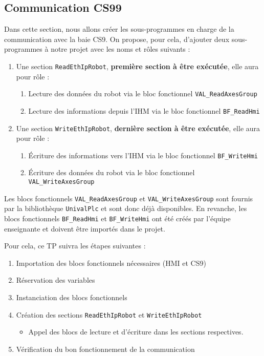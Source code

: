 
\subsection{Communication CS99}
Dans cette section, nous allons créer les sous-programmes en charge de la communication avec la baie CS9. 
On propose, pour cela, d'ajouter deux sous-programmes à notre projet avec les noms et rôles suivants : 
\begin{enumerate}
    \item Une section \texttt{ReadEthIpRobot}, \textbf{première section à être exécutée}, elle aura pour rôle :
    \begin{enumerate}
        \item Lecture des données du robot via le bloc fonctionnel \texttt{VAL\_ReadAxesGroup}
        \item Lecture des informations depuis l'IHM via le bloc fonctionnel \texttt{BF\_ReadHmi}
    \end{enumerate} 
    \item Une section \texttt{WriteEthIpRobot}, \textbf{dernière section à être exécutée}, elle aura pour rôle :
    \begin{enumerate}[resume]
        \item Écriture des informations vers l'IHM via le bloc fonctionnel \texttt{BF\_WriteHmi}
        \item Écriture des données du robot via le bloc fonctionnel \texttt{VAL\_WriteAxesGroup}
    \end{enumerate}
\end{enumerate}

Les blocs fonctionnels \texttt{VAL\_ReadAxesGroup} et \texttt{VAL\_WriteAxesGroup} sont fournis par la bibliothèque \texttt{UnivalPlc} et sont donc déjà disponibles. 
En revanche, les blocs fonctionnels \texttt{BF\_ReadHmi} et \texttt{BF\_WriteHmi} ont été créés par l'équipe enseignante et doivent être importés dans le projet. 

Pour cela, ce TP suivra les étapes suivantes : 
\begin{enumerate}
    \item Importation des blocs fonctionnels nécessaires (HMI et CS9)
    \item Réservation des variables 
    \item Instanciation des blocs fonctionnels
    \item Création des sections \texttt{ReadEthIpRobot} et \texttt{WriteEthIpRobot}
    \begin{itemize}
        \item Appel des blocs de lecture et d'écriture dans les sections respectives. 
    \end{itemize}
    \item Vérification du bon fonctionnement de la communication
\end{enumerate}

